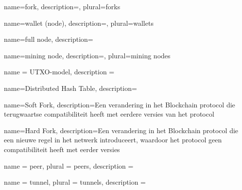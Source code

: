 



 {
  name={fork},
  description={},
  plural={forks}
}

 {
  name={wallet (node)},
  description={},
  plural={wallets}
}

 {
  name={full node},
  description={}
}

 {
  name={mining node},
  description={},
  plural={mining nodes}
}





 {
  name = {UTXO-model},
  description = {}
}

 {
  name={Distributed Hash Table},
  description={}
}

 {
  name={Soft Fork},
  description={Een verandering in het Blockchain protocol die terugwaartse compatibiliteit heeft met eerdere versies van het protocol}
}

 {
  name={Hard Fork},
  description={Een verandering in het Blockchain protocol die een nieuwe regel in het netwerk introduceert, waardoor het protocol geen compatibiliteit heeft met eerder versies}
}

 {
  name = {peer},
  plural = {peers},
  description = {}
}

 {
  name = {tunnel},
  plural = {tunnels},
  description = {}
}

